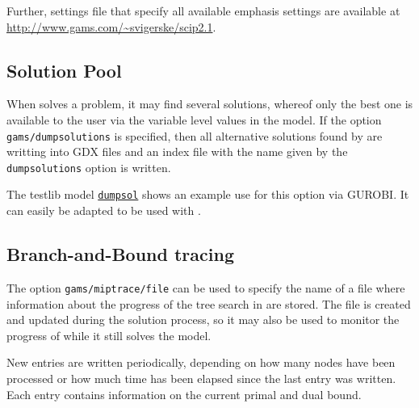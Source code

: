 Further, settings file that specify all available emphasis settings are available at \url{http://www.gams.com/~svigerske/scip2.1}.

\subsection{Solution Pool}

When \SCIP solves a problem, it may find several solutions, whereof only the best one is available to the \GAMS user via the variable level values in the \GAMS model.
If the option \texttt{gams/dumpsolutions} is specified, then all alternative solutions found by \SCIP are writting into GDX files and an index file with the name given by the \texttt{dumpsolutions} option is written.

The \GAMS testlib model \href{http://www.gams.com/testlib/libhtml/dumpsol.htm}{\texttt{dumpsol}} shows an example use for this option via GUROBI. It can easily be adapted to be used with \SCIP.

\subsection{Branch-and-Bound tracing}

The option \texttt{gams/miptrace/file} can be used to specify the name of a file where information about the progress of the tree search in \SCIP are stored. The file is created and updated during the solution process, so it may also be used to monitor the progress of \SCIP while it still solves the model.

New entries are written periodically, depending on how many nodes have been processed or how much time has been elapsed since the last entry was written. Each entry contains information on the current primal and dual bound.


